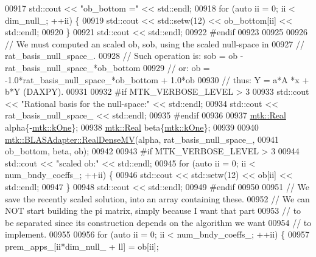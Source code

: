 \begin{DoxyCode}
{{00917     std::cout << \textcolor{stringliteral}{"ob\_bottom ="} << std::endl;
00918     \textcolor{keywordflow}{for} (\textcolor{keyword}{auto} ii = 0; ii < dim\_null\_; ++ii) \{
00919       std::cout << std::setw(12) << ob\_bottom[ii] << std::endl;
00920     \}
00921     std::cout << std::endl;
00922 \textcolor{preprocessor}{    #endif}
00923 
00925 
00926     \textcolor{comment}{// We must computed an scaled ob, sob, using the scaled null-space in}
00927     \textcolor{comment}{// rat\_basis\_null\_space\_.}
00928     \textcolor{comment}{// Such operation is: sob = ob - rat\_basis\_null\_space\_*ob\_bottom}
00929     \textcolor{comment}{// or:                 ob = -1.0*rat\_basis\_null\_space\_*ob\_bottom + 1.0*ob}
00930     \textcolor{comment}{// thus:                Y =    a*A    *x         +   b*Y (DAXPY).}
00931 
00932 \textcolor{preprocessor}{    #if MTK\_VERBOSE\_LEVEL > 3}
00933     std::cout << \textcolor{stringliteral}{"Rational basis for the null-space:"} << std::endl;
00934     std::cout << rat\_basis\_null\_space\_ << std::endl;
00935 \textcolor{preprocessor}{    #endif}
00936 
00937     \hyperlink{group__c01-roots_gac080bbbf5cbb5502c9f00405f894857d}{mtk::Real} alpha\{-\hyperlink{group__c01-roots_ga26407c24d43b6b95480943340d285c71}{mtk::kOne}\};
00938     \hyperlink{group__c01-roots_gac080bbbf5cbb5502c9f00405f894857d}{mtk::Real} beta\{\hyperlink{group__c01-roots_ga26407c24d43b6b95480943340d285c71}{mtk::kOne}\};
00939 
00940     \hyperlink{classmtk_1_1BLASAdapter_afdcac059a4294287cb55638221220646}{mtk::BLASAdapter::RealDenseMV}(alpha, rat\_basis\_null\_space\_,
00941                                   ob\_bottom, beta, ob);
00942 
00943 \textcolor{preprocessor}{    #if MTK\_VERBOSE\_LEVEL > 3}
00944     std::cout << \textcolor{stringliteral}{"scaled ob:"} << std::endl;
00945     \textcolor{keywordflow}{for} (\textcolor{keyword}{auto} ii = 0; ii < num\_bndy\_coeffs\_; ++ii) \{
00946       std::cout << std::setw(12) << ob[ii] << std::endl;
00947     \}
00948     std::cout << std::endl;
00949 \textcolor{preprocessor}{    #endif}
00950 
00951     \textcolor{comment}{// We save the recently scaled solution, into an array containing these.}
00952     \textcolor{comment}{// We can NOT start building the pi matrix, simply because I want that part}
00953     \textcolor{comment}{// to be separated since its construction depends on the algorithm we want}
00954     \textcolor{comment}{// to implement.}
00955 
00956     \textcolor{keywordflow}{for} (\textcolor{keyword}{auto} ii = 0; ii < num\_bndy\_coeffs\_; ++ii) \{
00957       prem\_apps\_[ii*dim\_null\_ + ll] = ob[ii];
}}
\end{DoxyCode}
